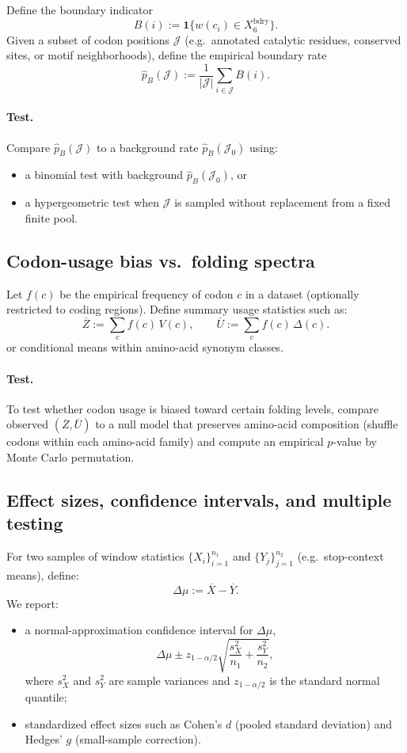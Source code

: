 Define the boundary indicator
\[
B(i):=\mathbf{1}\{w(c_i)\in X_6^{\mathrm{bdry}}\}.
\]
Given a subset of codon positions $\mathcal{J}$ (e.g.\ annotated catalytic residues, conserved sites, or motif neighborhoods), define the empirical boundary rate
\[
\widehat{p}_B(\mathcal{J}) := \frac{1}{|\mathcal{J}|}\sum_{i\in\mathcal{J}} B(i).
\]

\paragraph{Test.}
Compare $\widehat{p}_B(\mathcal{J})$ to a background rate $\widehat{p}_B(\mathcal{J}_0)$ using:
\begin{itemize}
\item a binomial test with background $\widehat{p}_B(\mathcal{J}_0)$, or
\item a hypergeometric test when $\mathcal{J}$ is sampled without replacement from a fixed finite pool.
\end{itemize}

\subsection{Codon-usage bias vs.\ folding spectra}
\label{app:codon_usage_bias}

Let $f(c)$ be the empirical frequency of codon $c$ in a dataset (optionally restricted to coding regions).
Define summary usage statistics such as:
\[
\overline{Z}:=\sum_{c} f(c)\,V(c),
\qquad
\overline{U}:=\sum_{c} f(c)\,\Delta(c).
\]
or conditional means within amino-acid synonym classes.

\paragraph{Test.}
To test whether codon usage is biased toward certain folding levels, compare observed $(\overline{Z},\overline{U})$ to a null model that preserves amino-acid composition (shuffle codons within each amino-acid family) and compute an empirical $p$-value by Monte Carlo permutation.

\subsection{Effect sizes, confidence intervals, and multiple testing}
\label{app:effect_sizes}

For two samples of window statistics $\{X_i\}_{i=1}^{n_1}$ and $\{Y_j\}_{j=1}^{n_2}$ (e.g.\ stop-context means), define:
\[
\Delta\mu := \overline{X}-\overline{Y}.
\]
We report:
\begin{itemize}
\item a normal-approximation confidence interval for $\Delta\mu$,
\[
\Delta\mu \pm z_{1-\alpha/2}\sqrt{\frac{s_X^2}{n_1}+\frac{s_Y^2}{n_2}},
\]
where $s_X^2$ and $s_Y^2$ are sample variances and $z_{1-\alpha/2}$ is the standard normal quantile;
\item standardized effect sizes such as Cohen's $d$ (pooled standard deviation) and Hedges' $g$ (small-sample correction).
\end{itemize}

